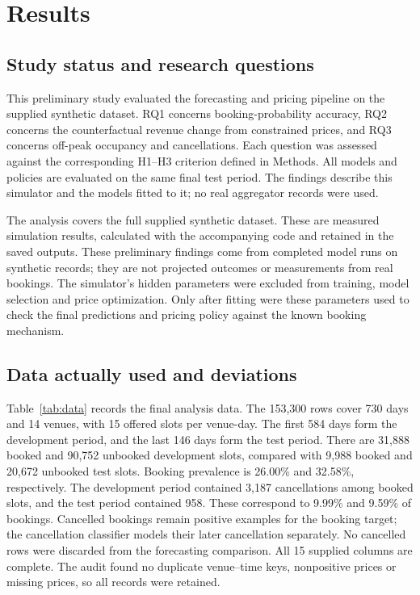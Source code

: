 \section{Results}
\label{sec:results}
\subsection{Study status and research questions}
This preliminary study evaluated the forecasting and pricing pipeline on the supplied synthetic dataset. RQ1 concerns booking-probability accuracy, RQ2 concerns the counterfactual revenue change from constrained prices, and RQ3 concerns off-peak occupancy and cancellations. Each question was assessed against the corresponding H1--H3 criterion defined in Methods. All models and policies are evaluated on the same final test period. The findings describe this simulator and the models fitted to it; no real aggregator records were used.

The analysis covers the full supplied synthetic dataset. These are measured simulation results, calculated with the accompanying code and retained in the saved outputs. These preliminary findings come from completed model runs on synthetic records; they are not projected outcomes or measurements from real bookings. The simulator's hidden parameters were excluded from training, model selection and price optimization. Only after fitting were these parameters used to check the final predictions and pricing policy against the known booking mechanism.

\subsection{Data actually used and deviations}
Table~\ref{tab:data} records the final analysis data. The 153,300 rows cover 730 days and 14 venues, with 15 offered slots per venue-day. The first 584 days form the development period, and the last 146 days form the test period. There are 31,888 booked and 90,752 unbooked development slots, compared with 9,988 booked and 20,672 unbooked test slots. Booking prevalence is 26.00\% and 32.58\%, respectively. The development period contained 3,187 cancellations among booked slots, and the test period contained 958. These correspond to 9.99\% and 9.59\% of bookings. Cancelled bookings remain positive examples for the booking target; the cancellation classifier models their later cancellation separately. No cancelled rows were discarded from the forecasting comparison. All 15 supplied columns are complete. The audit found no duplicate venue--time keys, nonpositive prices or missing prices, so all records were retained.


